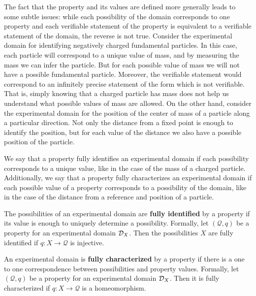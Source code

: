 \documentclass[11pt,letterpaper,fleqn]{memoir} %
\begin{document}
The fact that the property and its values are defined more generally leads to some subtle issues: while each possibility of the domain corresponds to one property and each verifiable statement of the property is equivalent to a verifiable statement of the domain, the reverse is not true. Consider the experimental domain for identifying negatively charged fundamental particles. In this case, each particle will correspond to a unique value of mass, and by measuring the mass we can infer the particle. But for each possible value of mass we will not have a possible fundamental particle. Moreover, the verifiable statement  would correspond to an infinitely precise statement of the form  which is not verifiable. That is, simply knowing that a charged particle has mass does not help us understand what possible values of mass are allowed. On the other hand, consider the experimental domain for the position of the center of mass of a particle along a particular direction. Not only the distance from a fixed point is enough to identify the position, but for each value of the distance we also have a possible position of the particle.

We say that a property fully identifies an experimental domain if each possibility corresponds to a unique value, like in the case of the mass of a charged particle. Additionally, we say that a property fully characterizes an experimental domain if each possible value of a property corresponds to a possibility of the domain, like in the case of the distance from a reference and position of a particle.

\begin{mathSection}
	\begin{defn}
		The possibilities of an experimental domain are \textbf{fully identified} by a property if its value is enough to uniquely determine a possibility. Formally, let $(\mathcal{Q}, q)$ be a property for an experimental domain $\mathcal{D}_X$. Then the possibilities $X$ are fully identified if $q: X \to \mathcal{Q}$ is injective.
	\end{defn}
	
	\begin{defn}
		An experimental domain is \textbf{fully characterized} by a property if there is a one to one correspondence between possibilities and property values. Formally, let $(\mathcal{Q}, q)$ be a property for an experimental domain $\mathcal{D}_X$. Then it is fully characterized if $q: X \to \mathcal{Q}$ is a homeomorphism.
	\end{defn}
\end{mathSection}
\end{document}
